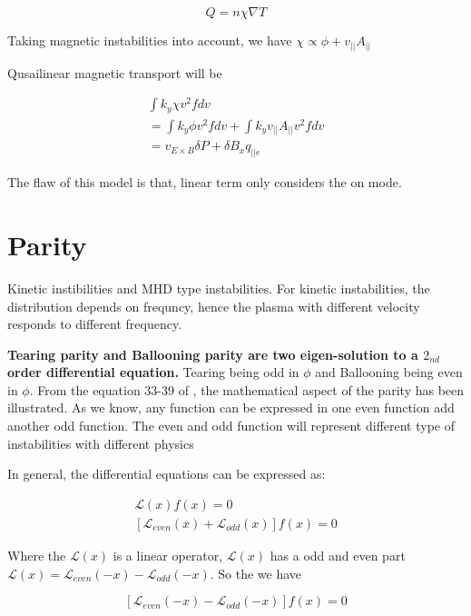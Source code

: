\begin{equation}
    Q=n\chi \nabla T
\end{equation}

Taking magnetic instabilities into account, we have $\chi \propto \phi+v_{||}A_{||} $

Qusailinear magnetic transport will be 

\begin{eqnarray}
    \int k_y \chi v^2 f dv\\
    =\int k_y \phi v^2 f dv + 
      \int k_y v_{||}A_{||} v^2 f dv\\
    =v_{E\times B} \delta P
    +\delta B_x q_{|| e}
\end{eqnarray}

The flaw of this model is that, linear term only considers the on mode. 

\section{Parity}

Kinetic instibilities and MHD type instabilities. For kinetic instabilities, the distribution depends on frequncy, hence the plasma with different velocity responds to different frequency. 

\textbf{Tearing parity and Ballooning parity are two eigen-solution to a $2_{nd}$ order differential equation.} Tearing being odd in $\phi$ and Ballooning being even in $\phi$. From the equation 33-39 of \cite{tearing_parity}, the mathematical aspect of the parity has been illustrated. As we know, any function can be expressed in one even function add another odd function. The even and odd function will represent different type of instabilities with different physics

In general, the differential equations can be expressed as:

\begin{eqnarray}
    \mathcal{L}(x) f(x)=0 \\
    \left[\mathcal{L}_{even}(x)+\mathcal{L}_{odd}(x)\right]f(x)=0 
    \label{eq:lxfx}
\end{eqnarray}

Where the $\mathcal{L}(x)$ is a linear operator, $\mathcal{L}(x)$ has a odd and even part $\mathcal{L}(x)=\mathcal{L}_{even}(-x)-\mathcal{L}_{odd}(-x)$. So the we have

\begin{equation}
    \left[\mathcal{L}_{even}(-x)-\mathcal{L}_{odd}(-x)\right]f(x)=0
\end{equation}

